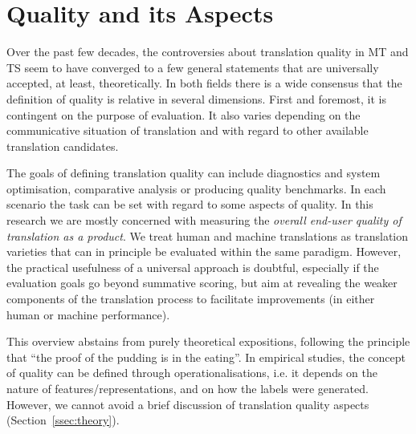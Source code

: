 \section{\label{sec:aspects}Quality and its Aspects}

Over the past few decades, the controversies about translation quality in MT and TS seem to have converged to a few general statements that are universally accepted, at least, theoretically.
In both fields there is a wide consensus that the definition of quality is relative in several dimensions. First and foremost, it is contingent on the purpose of evaluation. It also varies depending on the communicative situation of translation and with regard to other available translation candidates. 

The goals of defining translation quality can include diagnostics and system optimisation, comparative analysis or producing quality benchmarks. In each scenario the task can be set with regard to some aspects of quality. In this research we are mostly concerned with measuring the \textit{overall end-user quality of translation as a product}. We treat human and machine translations as translation varieties that can in principle be evaluated within the same paradigm. However, the practical usefulness of a universal approach is doubtful, especially if the evaluation goals go beyond summative scoring, but aim at revealing the weaker components of the translation process to facilitate improvements (in either human or machine performance).
 
This overview abstains from purely theoretical expositions, following the principle that ``the proof of the pudding is in the eating''. In empirical studies, the concept of quality can be defined through operationalisations, i.e. it depends on the nature of features/representations, and on how the labels were generated. However, we cannot avoid a brief discussion of translation quality aspects
(Section~\ref{ssec:theory}).

